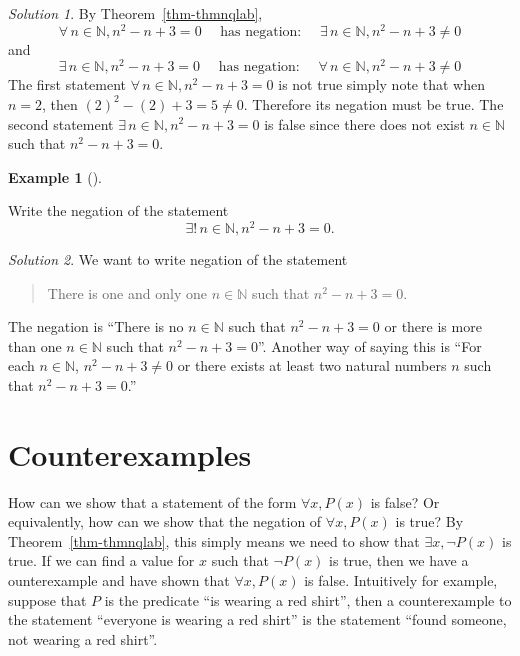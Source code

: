 \documentclass[
  letterpaper,
  10pt,
  reqno,
  twopage,
  openany]{book}
\theoremstyle{plain}
\theoremstyle{definition}
\theoremstyle{definition}
\theoremstyle{definition}
\newtheorem{example}{Example}[chapter]
\theoremstyle{plain}
\theoremstyle{plain}
\theoremstyle{remark}
\newtheorem*{solution}{Solution}
\begin{document}
\begin{solution}

By Theorem~\ref{thm-thmnqlab},\\
\[
\forall \, n\in \mathbb{N}, n^2-n+3=0
\quad \text{ has negation: } \quad 
\exists \, n\in \mathbb{N}, n^2-n+3\neq 0
\] and \begin{equation}
\exists \, n\in \mathbb{N}, n^2-n+3=0
\quad \text{ has negation: } \quad 
\forall \, n\in \mathbb{N}, n^2-n+3\neq 0
\end{equation} The first statement
\(\forall \, n\in \mathbb{N}, n^2-n+3=0\) is not true simply note that
when \(n=2\), then \((2)^2-(2)+3=5\neq 0\). Therefore its negation must
be true. The second statement \(\exists \, n\in \mathbb{N}, n^2-n+3=0\)
is false since there does not exist \(n\in \mathbb{N}\) such that
\(n^2-n+3=0\).

\end{solution}

\leavevmode{}%
\begin{example}[]\label{exm-nq-2}

Write the negation of the statement \[
\exists !\, n\in \mathbb{N}, n^2-n+3=0.
\]

\end{example}

\begin{solution}

We want to write negation of the statement

\begin{quote}
There is one and only one \(n\in \mathbb{N}\) such that \(n^2-n+3=0\).
\end{quote}

The negation is ``There is no \(n\in \mathbb{N}\) such that
\(n^2-n+3=0\) or there is more than one \(n\in \mathbb{N}\) such that
\(n^2-n+3=0\)''. Another way of saying this is ``For each
\(n\in \mathbb{N}\), \(n^2-n+3\neq 0\) or there exists at least two
natural numbers \(n\) such that \(n^2-n+3=0\).''

\end{solution}

\hypertarget{counterexamples}{%
\section{Counterexamples}\label{counterexamples}}

How can we show that a statement of the form \(\forall x, P(x)\) is
false? Or equivalently, how can we show that the negation of
\(\forall x, P(x)\) is true? By Theorem~\ref{thm-thmnqlab}, this simply
means we need to show that \(\exists x, \neg P(x)\) is true. If we can
find a value for \(x\) such that \(\neg P(x)\) is true, then we have a
ounterexample and have shown that \(\forall x, P(x)\) is false.
Intuitively for example, suppose that \(P\) is the predicate ``is
wearing a red shirt'', then a counterexample to the statement ``everyone
is wearing a red shirt'' is the statement ``found someone, not wearing a
red shirt''.
\end{document}
